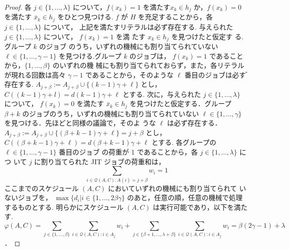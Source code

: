 \documentclass[12pt]{optlab-bachelor}
\begin{document}
\begin{proof}
  各 $j\in \{1,\ldots,\lambda\}$ について，$f(x_k)=1$ を満たす$x_k \in
  h_j$ か，$f(x_k)=0$ を満たす $\bar x_k \in h_j$ をひとつ見つける. $f$ が $H$ を充足することから，各 $j \in \{1,\ldots,\lambda\}$ について， 上記を満たすリテラルは必ず存在する.
  与えられた $j \in \{1,\ldots,\lambda \}$ について， $f(x_k) = 1$ を満
  たす $x_k \in h_j$ を見つけたと仮定す る.グループ $k$ のジョブ
  のうち，いずれの機械にも割り当てられていない $\ell \in
  \{1,\ldots,\gamma - 1\}$ を見つける.グループ $k$ のジョブは，
  $f (x_k) = 1$ であることから，$\{1,\ldots, \beta \}$ のいずれの機
  械にも割り当てられておらず，また，各リテラルが現れる回数は高々
  $\gamma − 1$ であることから，そのような $\ell$ 番目のジョブは必す
  ゙存在する. $A_{j + \beta} := A_{j + \beta} \cup \{ (k − 1) \gamma +
  \ell\}$ とし， $C((k − 1)\gamma + l) = d(k−1)\gamma + \ell$ とする.
  次に，与えられた $j \in \{1,\ldots,\lambda\}$ について， $f(x_k) = 0$
  を満たす $\bar x_k \in h_j$ を見つけたと仮定する．グループ $\beta
  + k$ のジョブのうち，いずれの機械にも割り当てられていない $\ell
  \in \{1,\ldots,\gamma\}$ を見つける．先ほどと同様の議論で，そのよ
  うな $\ell$ は必ず存在する． $A_{j + \beta} := A_{j + \beta} \cup \{
  (\beta + k − 1 ) \gamma + \ell \} = j + \beta$ とし，$C((\beta + k −
  1) \gamma + \ell) = d(\beta + k − 1)\gamma + \ell$ とする.
  各グループの $\ell \in \{1,\ldots,\gamma − 1\}$ 番目のジョブ
  の荷重が 1 であることから，各 $j \in \{1,\ldots, \lambda \}$ につ
  いて $j$ に割り当てられた JIT ジョブの荷重和は，
  $$\displaystyle \sum_{i \in \mathcal{Q}(A,C):A(i) = j + \beta}w_i =
  1$$
  ここまでのスケジュール $(A, C)$ においていずれの機械にも割り当てられて
  いないジョブを， $\max\{d_i | i \in \{1,\ldots, 2\beta \gamma\}$ のあと，任意の順，任意の機械で処理するものとする.
  明らかにスケジュール $(A, C)$ は実行可能であり，以下を満たす.
  $$\displaystyle \varphi(A,C) = \sum_{j \in
  \{1,\ldots,\beta\}} \sum_{i \in \mathcal{Q}(A,C):i \in
  A_j}w_i + \sum_{j \in
  \{\beta + 1,\ldots,\lambda + \beta\}} \sum_{i \in \mathcal{Q}(A,C):i \in
  A_j}w_i =
  \beta(2\gamma - 1) + \lambda$$．
\end{proof}
\end{document}
